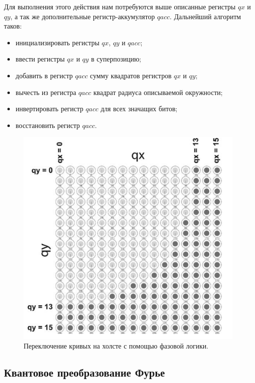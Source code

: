 Для выполнения этого действия нам потребуются выше описанные регистры $qx$ и $qy$, а так же дополнительные регистр-аккумулятор $qacc$. Дальнейший алгоритм таков:

\begin{itemize}
	\item инициализировать регистры $qx$, $qy$ и $qacc$;
	\item ввести регистры $qx$ и $qy$ в суперпозицию;
	\item добавить в регистр $qacc$ сумму квадратов регистров $qx$ и $qy$;
	\item вычесть из регистра $qacc$ квадрат радиуса описываемой окружности;
	\item инвертировать регистр $qacc$ для всех значащих битов;
	\item восстановить регистр $qacc$.
\end{itemize}

\begin{figure}[h]
	\begin{center}
		\includegraphics[scale=0.57]{img/holst_03.png}
	\end{center}
	\captionsetup{justification=centering}
	\caption{Переключение кривых на холсте с помощью фазовой логики.}
	\label{for:holst_03}
\end{figure}

\subsection{Квантовое преобразование Фурье}\label{furie}

